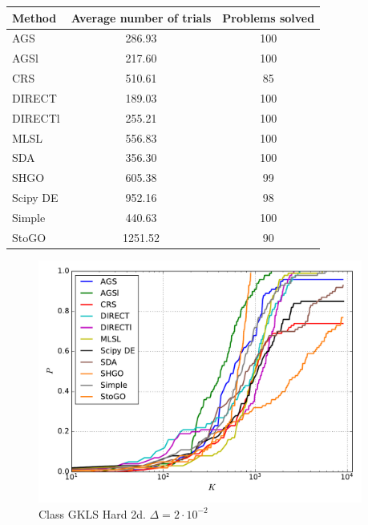 \documentclass[a4paper]{article}
\begin{document}
\begin{tabular}{lcc}
\hline
 Method   &  Average number of trials  &  Problems solved  \\
\hline
 AGS      &           286.93           &        100        \\
 AGSl     &           217.60           &        100        \\
 CRS      &           510.61           &        85         \\
 DIRECT   &           189.03           &        100        \\
 DIRECTl  &           255.21           &        100        \\
 MLSL     &           556.83           &        100        \\
 SDA      &           356.30           &        100        \\
 SHGO     &           605.38           &        99         \\
 Scipy DE &           952.16           &        98         \\
 Simple   &           440.63           &        100        \\
 StoGO    &          1251.52           &        90         \\
\hline
\end{tabular}
\begin{figure}[H]
  \center
  \includegraphics[width=0.95\textwidth]{../experiments/gklsh2d/cmc.pdf}
  \caption{Class GKLS Hard 2d. $\Delta=2\cdot10^{-2}$}
\end{figure}
\end{document}
